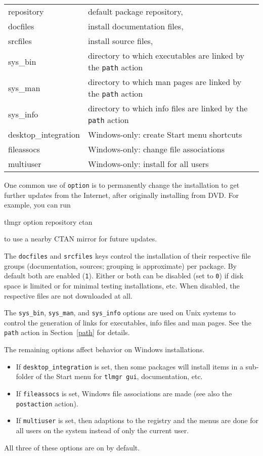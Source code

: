 \documentclass[11pt]{article}
\renewcommand{\ttfamily}{\fontencoding{OT1}\fontfamily{cmtt}\selectfont}
\begin{document}
\begin{center}
\begin{small}
\begin{tabular}{@{\ttfamily}ll}
    repository &default package repository,\\
    docfiles & install documentation files,\\
    srcfiles & install source files,\\
    sys\_bin &  directory to which executables are linked by the \texttt{path} action\\
    sys\_man &  directory to which man pages are linked by the \texttt{path} action\\
    sys\_info&  directory to which info files are linked by the \texttt{path} action\\
    desktop\_integration & Windows-only: create Start menu shortcuts\\
    fileassocs& Windows-only: change file associations\\
    multiuser &Windows-only: install for all users\\
\end{tabular}
\end{small}
\end{center}

\noindent
One common use of \texttt{option} is to permanently change
the installation to get further updates from the Internet,
after originally installing from DVD\@. For example, you can
run
\begin{center}\ttfamily
   tlmgr option repository ctan
\end{center}
to use a nearby CTAN mirror for future updates.

The \texttt{docfiles} and \texttt{srcfiles} keys control the
installation of their respective file groups (documentation,
sources; grouping is approximate) per package. By default
both are enabled (\verb|1|). Either or both can be disabled
(set to \verb|0|) if disk space is limited or for minimal
testing installations, etc. When disabled, the respective
files are not downloaded at all.

The \verb|sys_bin|, \verb|sys_man|, and \verb|sys_info|
options are used on Unix systems to control the generation
of links for executables, info files and man pages. See the
\texttt{path} action in Section~\ref{path} for details.

The remaining options affect behavior on Windows installations.  

\begin{itemize}
  \item If \texttt{desktop\_integration} is set,
then some packages will install items in a sub-folder of the Start menu for \texttt{tlmgr gui},
documentation, etc.  
  \item If \texttt{fileassocs} is set, Windows file associations are made (see also the
\texttt{postaction} action).  
   \item If \texttt{multiuser} is set, then adaptions to the registry and the
menus are done for all users on the system instead of only the current user.  
\end{itemize}
All three of these options are on by default.
\end{document}
